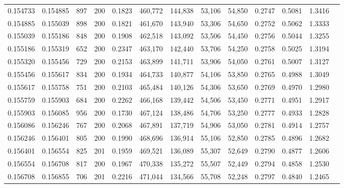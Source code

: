 \begin{tabular}{rrrrrrrrrrrrr}
0.154733 & 0.154885 &    897 & 200 &                                     0.1823 & 460,772 & 144,838 &  53,106 &  54,850 & 0.2747 & 0.5081 & 1.3416 \\
0.154885 & 0.155039 &    898 & 200 &                                     0.1821 & 461,670 & 143,940 &  53,306 &  54,650 & 0.2752 & 0.5062 & 1.3333 \\
0.155039 & 0.155186 &    848 & 200 &                                     0.1908 & 462,518 & 143,092 &  53,506 &  54,450 & 0.2756 & 0.5044 & 1.3255 \\
0.155186 & 0.155319 &    652 & 200 &                                     0.2347 & 463,170 & 142,440 &  53,706 &  54,250 & 0.2758 & 0.5025 & 1.3194 \\
0.155320 & 0.155456 &    729 & 200 &                                     0.2153 & 463,899 & 141,711 &  53,906 &  54,050 & 0.2761 & 0.5007 & 1.3127 \\
0.155456 & 0.155617 &    834 & 200 &                                     0.1934 & 464,733 & 140,877 &  54,106 &  53,850 & 0.2765 & 0.4988 & 1.3049 \\
0.155617 & 0.155758 &    751 & 200 &                                     0.2103 & 465,484 & 140,126 &  54,306 &  53,650 & 0.2769 & 0.4970 & 1.2980 \\
0.155759 & 0.155903 &    684 & 200 &                                     0.2262 & 466,168 & 139,442 &  54,506 &  53,450 & 0.2771 & 0.4951 & 1.2917 \\
0.155903 & 0.156085 &    956 & 200 &                                     0.1730 & 467,124 & 138,486 &  54,706 &  53,250 & 0.2777 & 0.4933 & 1.2828 \\
0.156086 & 0.156246 &    767 & 200 &                                     0.2068 & 467,891 & 137,719 &  54,906 &  53,050 & 0.2781 & 0.4914 & 1.2757 \\
0.156246 & 0.156401 &    805 & 200 &                                     0.1990 & 468,696 & 136,914 &  55,106 &  52,850 & 0.2785 & 0.4896 & 1.2682 \\
0.156401 & 0.156554 &    825 & 201 &                                     0.1959 & 469,521 & 136,089 &  55,307 &  52,649 & 0.2790 & 0.4877 & 1.2606 \\
0.156554 & 0.156708 &    817 & 200 &                                     0.1967 & 470,338 & 135,272 &  55,507 &  52,449 & 0.2794 & 0.4858 & 1.2530 \\
0.156708 & 0.156855 &    706 & 201 &                                     0.2216 & 471,044 & 134,566 &  55,708 &  52,248 & 0.2797 & 0.4840 & 1.2465 \\

\end{tabular}
